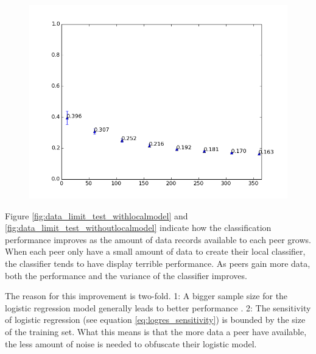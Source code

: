 \begin{figure}[h!]
\begin{minipage}{.49\linewidth}
		\label{fig:data_limit_test_withlocalmodel}
	\end{minipage}
	\begin{minipage}{.49\linewidth}
		\includegraphics[width=\linewidth]{fig/spambase/eps0.1,budg=eps,peers10,groups10,reg2e-2-pubAll-spam-baseline-data10-360-testset-localmodelonly}
		\label{fig:data_limit_test_localmodelonly}
	\end{minipage}
\end{figure}


Figure \ref{fig:data_limit_test_withlocalmodel} and \ref{fig:data_limit_test_withoutlocalmodel} indicate how the classification performance improves as the amount of data records available to each peer grows. When each peer only have a small amount of data to create their local classifier, the classifier tends to have display terrible performance. As peers gain more data, both the performance and the variance of the classifier improves.     

The reason for this improvement is two-fold. 1: A bigger sample size for the logistic regression model generally leads to better performance \cite{peduzzi1996simulation}. 2: The sensitivity of logistic regression (see equation \ref{eq:logres_sensitivity}) is bounded by the size of the training set. What this means is that the more data a peer have available, the less amount of noise is needed to obfuscate their logistic model. 

